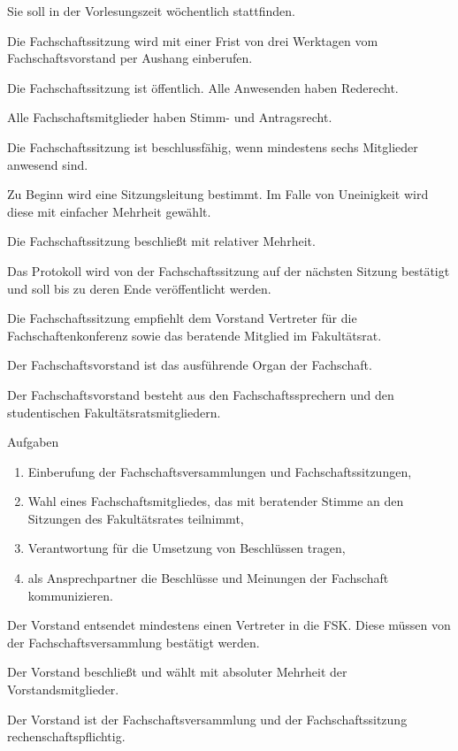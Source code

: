 \documentclass[a4paper,parskip=half,numbers=noenddot]{scrartcl}
\begin{document}
\begin{contract}
Sie soll in der Vorlesungszeit wöchentlich stattfinden.

Die Fachschaftssitzung wird mit einer Frist von drei Werktagen vom Fachschaftsvorstand per Aushang einberufen.

Die Fachschaftssitzung ist öffentlich. Alle Anwesenden haben Rederecht.

Alle Fachschaftsmitglieder haben Stimm- und Antragsrecht.

Die Fachschaftssitzung ist beschlussfähig, wenn mindestens sechs Mitglieder anwesend sind.

Zu Beginn wird eine Sitzungsleitung bestimmt. Im Falle von Uneinigkeit wird diese mit einfacher Mehrheit gewählt.

Die Fachschaftssitzung beschließt mit relativer Mehrheit. 

Das Protokoll wird von der Fachschaftssitzung auf der nächsten Sitzung bestätigt und soll bis zu deren Ende veröffentlicht werden.

Die Fachschaftssitzung empfiehlt dem Vorstand Vertreter für die Fachschaftenkonferenz sowie das beratende Mitglied im Fakultätsrat.


\label{fs:vorstand}

Der Fachschaftsvorstand ist das ausführende Organ der Fachschaft.

Der Fachschaftsvorstand besteht aus den Fachschaftssprechern und den studentischen Fakultätsratsmitgliedern.

Aufgaben
\begin{enumerate}
\item Einberufung der Fachschaftsversammlungen und Fachschaftssitzungen,
\item Wahl eines Fachschaftsmitgliedes, das mit beratender Stimme an den Sitzungen des Fakultätsrates teilnimmt,
\item Verantwortung für die Umsetzung von Beschlüssen tragen,
\item als Ansprechpartner die Beschlüsse und Meinungen der Fachschaft kommunizieren.
\end{enumerate}
 
Der Vorstand entsendet mindestens einen Vertreter in die FSK. Diese müssen von der Fachschaftsversammlung bestätigt werden.

Der Vorstand beschließt und wählt mit absoluter Mehrheit der Vorstandsmitglieder.

Der Vorstand ist der Fachschaftsversammlung und der Fachschaftssitzung rech\-en\-schafts\-pflichtig.



\end{contract}
\end{document}
